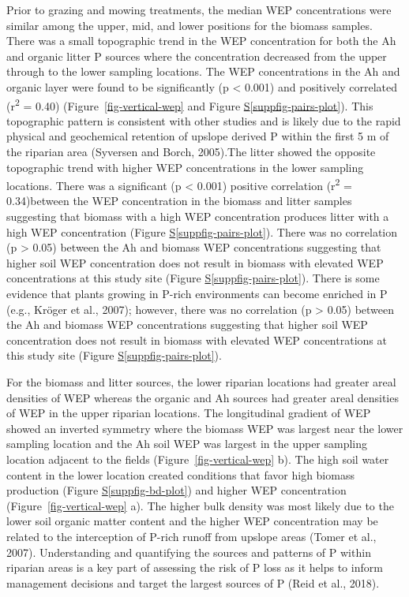 \documentclass[
]{agujournal2019}
\newcommand*\quartosuppfigref[1]{Figure \hyperref[#1]{S\ref{#1}}}
\begin{document}
Prior to grazing and mowing treatments, the median WEP concentrations
were similar among the upper, mid, and lower positions for the biomass
samples. There was a small topographic trend in the WEP concentration
for both the Ah and organic litter P sources where the concentration
decreased from the upper through to the lower sampling locations. The
WEP concentrations in the Ah and organic layer were found to be
significantly (p \textless{} 0.001) and positively correlated
(r\textsuperscript{2} = 0.40) (Figure~\ref{fig-vertical-wep} and
\quartosuppfigref{suppfig-pairs-plot}). This topographic pattern is
consistent with other studies and is likely due to the rapid physical
and geochemical retention of upslope derived P within the first 5 m of
the riparian area (Syversen and Borch, 2005).The litter showed the
opposite topographic trend with higher WEP concentrations in the lower
sampling locations. There was a significant (p \textless{} 0.001)
positive correlation (r\textsuperscript{2} = 0.34)between the WEP
concentration in the biomass and litter samples suggesting that biomass
with a high WEP concentration produces litter with a high WEP
concentration (\quartosuppfigref{suppfig-pairs-plot}). There was no
correlation (p \textgreater{} 0.05) between the Ah and biomass WEP
concentrations suggesting that higher soil WEP concentration does not
result in biomass with elevated WEP concentrations at this study site
(\quartosuppfigref{suppfig-pairs-plot}). There is some evidence that
plants growing in P-rich environments can become enriched in P (e.g.,
Kröger et al., 2007); however, there was no correlation (p
\textgreater{} 0.05) between the Ah and biomass WEP concentrations
suggesting that higher soil WEP concentration does not result in biomass
with elevated WEP concentrations at this study site
(\quartosuppfigref{suppfig-pairs-plot}).

For the biomass and litter sources, the lower riparian locations had
greater areal densities of WEP whereas the organic and Ah sources had
greater areal densities of WEP in the upper riparian locations. The
longitudinal gradient of WEP showed an inverted symmetry where the
biomass WEP was largest near the lower sampling location and the Ah soil
WEP was largest in the upper sampling location adjacent to the fields
(Figure~\ref{fig-vertical-wep} b). The high soil water content in the
lower location created conditions that favor high biomass production
(\quartosuppfigref{suppfig-bd-plot}) and higher WEP concentration
(Figure~\ref{fig-vertical-wep} a). The higher bulk density was most
likely due to the lower soil organic matter content and the higher WEP
concentration may be related to the interception of P-rich runoff from
upslope areas (Tomer et al., 2007). Understanding and quantifying the
sources and patterns of P within riparian areas is a key part of
assessing the risk of P loss as it helps to inform management decisions
and target the largest sources of P (Reid et al., 2018).
\end{document}
